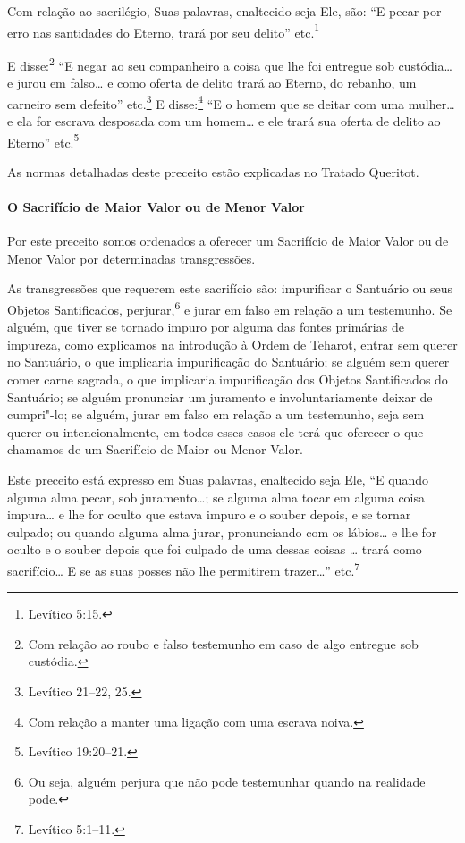 \begin{multicols}{2}
Com relação ao sacrilégio, Suas palavras, enaltecido seja Ele, são: ``E
pecar por erro nas santidades do Eterno, trará por seu delito'' etc.\footnote{Levítico 5:15.}

E disse:\footnote{Com relação ao roubo e falso testemunho em caso de algo entregue sob
  custódia.} ``E negar ao seu companheiro a coisa que
lhe foi entregue sob custódia\ldots{} e jurou em falso\ldots{} e como
oferta de delito trará ao Eterno, do rebanho, um carneiro sem defeito''
etc.\footnote{Levítico 21--22, 25.} E disse:\footnote{Com relação a manter uma ligação com uma escrava noiva.} ``E o homem que
se deitar com uma mulher\ldots{} e ela for escrava desposada com um
homem\ldots{} e ele trará sua oferta de delito ao Eterno'' etc.\footnote{Levítico
19:20--21.}

As normas detalhadas deste preceito estão explicadas no Tratado
Queritot\starr.

\paragraph{O Sacrifício de Maior Valor ou de Menor Valor}

Por este preceito somos ordenados a oferecer um Sacrifício de Maior
Valor ou de Menor Valor por determinadas transgressões.

As transgressões que requerem este sacrifício são: impurificar o
Santuário ou seus Objetos Santificados, perjurar,\footnote{Ou seja, alguém perjura que não pode testemunhar quando na realidade
  pode.} e
jurar em falso em relação a um testemunho. Se alguém, que tiver se
tornado impuro por alguma das fontes primárias de impureza, como explicamos na
introdução à Ordem de Teharot\starr, entrar sem querer no Santuário, o que
implicaria impurificação do Santuário; se alguém sem querer comer carne
sagrada, o que implicaria impurificação dos Objetos Santificados do
Santuário; se alguém pronunciar um juramento e involuntariamente deixar
de cumpri"-lo; se alguém, jurar em falso em relação a um testemunho, seja
sem querer ou intencionalmente, em todos esses casos ele terá que
oferecer o que chamamos de um Sacrifício de Maior ou Menor Valor.

Este preceito está expresso em Suas palavras, enaltecido seja Ele, ``E
quando alguma alma pecar, sob juramento\ldots{}; se alguma alma tocar em
alguma coisa impura\ldots{} e lhe for oculto que estava impuro e o souber
depois, e se tornar culpado; ou quando alguma alma jurar, pronunciando
com os lábios\ldots{} e lhe for oculto e o souber depois que foi culpado de
uma dessas coisas \ldots{} trará como sacrifício\ldots{} E se as suas posses não
lhe permitirem trazer\ldots{}'' etc.\footnote{Levítico 5:1--11.}


\end{multicols}

